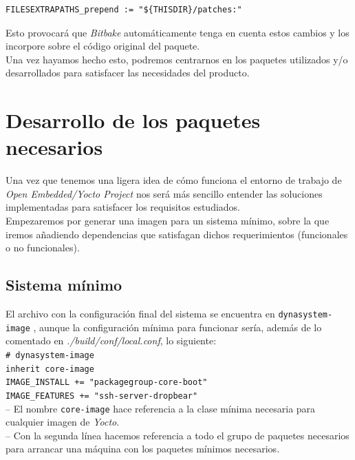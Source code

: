 \begin{lstlisting}
FILESEXTRAPATHS_prepend := "${THISDIR}/patches:"
\end{lstlisting}

Esto provocará que \textit{Bitbake} automáticamente tenga en cuenta estos cambios y los incorpore sobre el código original del paquete.\\

Una vez hayamos hecho esto, podremos centrarnos en los paquetes utilizados y/o desarrollados para satisfacer las necesidades del producto.

\section{Desarrollo de los paquetes necesarios}

Una vez que tenemos una ligera idea de cómo funciona el entorno de trabajo de \textit{Open Embedded/Yocto Project} nos será más sencillo entender las soluciones implementadas para satisfacer los requisitos estudiados.\\

Empezaremos por generar una imagen para un sistema mínimo, sobre la que iremos añadiendo dependencias que satisfagan dichos requerimientos (funcionales o no funcionales).

\subsection{Sistema mínimo}

El archivo con la configuración final del sistema se encuentra en \texttt{dynasystem-image} \cite{dynasystem-image}, aunque la configuración mínima para funcionar sería, además de lo comentado en \textit{./build/conf/local.conf}, lo siguiente:\\

\texttt{\# dynasystem-image\\
inherit core-image\\
IMAGE\_INSTALL += "packagegroup-core-boot"\\
IMAGE\_FEATURES += "ssh-server-dropbear"}\\

-- El nombre \texttt{core-image} hace referencia a la clase mínima necesaria para cualquier imagen de \textit{Yocto}.\\

-- Con la segunda línea hacemos referencia a todo el grupo de paquetes necesarios para arrancar una máquina con los paquetes mínimos necesarios.\\

